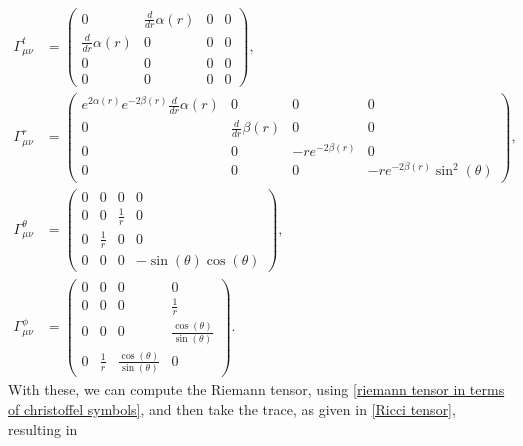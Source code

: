 \begin{align}
    \Gamma^t_{\mu \nu}
    & =
    \left(
        \begin{matrix}
            0 & \frac{d}{d r} \alpha{\left(r \right)} & 0 & 0\\\frac{d}{d r} \alpha{\left(r \right)} & 0 & 0 & 0\\0 & 0 & 0 & 0\\0 & 0 & 0 & 0
        \end{matrix}
    \right), \\
    \Gamma^r_{\mu \nu}
    &=
    \left(
        \begin{matrix}
            e^{2 \alpha{\left(r \right)}} e^{- 2 \beta{\left(r \right)}} \frac{d}{d r} \alpha{\left(r \right)} & 0 & 0 & 0\\0 & \frac{d}{d r} \beta{\left(r \right)} & 0 & 0\\0 & 0 & - r e^{- 2 \beta{\left(r \right)}} & 0\\0 & 0 & 0 & - r e^{- 2 \beta{\left(r \right)}} \sin^{2}{\left(\theta \right)}
        \end{matrix}
     \right), \\
     \Gamma^\theta_{\mu \nu} 
     & =
     \left(
         \begin{matrix}
            0 & 0 & 0 & 0\\0 & 0 & \frac{1}{r} & 0\\0 & \frac{1}{r} & 0 & 0\\0 & 0 & 0 & - \sin{\left(\theta \right)} \cos{\left(\theta \right)}
        \end{matrix}
    \right), \\
    \Gamma^\phi_{\mu \nu} 
    &=
    \left(
        \begin{matrix}
            0 & 0 & 0 & 0\\0 & 0 & 0 & \frac{1}{r}\\0 & 0 & 0 & \frac{\cos{\left(\theta \right)}}{\sin{\left(\theta \right)}}\\0 & \frac{1}{r} & \frac{\cos{\left(\theta \right)}}{\sin{\left(\theta \right)}} & 0
        \end{matrix}
    \right).
\end{align}
%
With these, we can compute the Riemann tensor, using \autoref{riemann tensor in terms of christoffel symbols}, and then take the trace, as given in \autoref{Ricci tensor}, resulting in  
%
